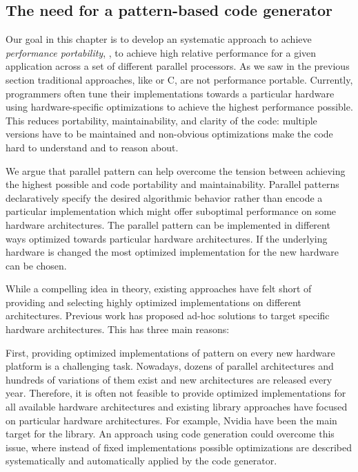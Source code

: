 

\subsection{The need for a pattern-based code generator}

Our goal in this chapter is to develop an systematic approach to achieve \emph{performance portability}, \ie, to achieve high relative performance for a given application across a set of different parallel processors.
As we saw in the previous section traditional approaches, like \OpenCL or C, are not performance portable.
Currently, programmers often tune their implementations towards a particular hardware using hardware-specific optimizations to achieve the highest performance possible.
This reduces portability, maintainability, and clarity of the code:
multiple versions have to be maintained and non-obvious optimizations make the code hard to understand and to reason about.

We argue that parallel pattern can help overcome the tension between achieving the highest possible and code portability and maintainability.
Parallel patterns declaratively specify the desired algorithmic behavior rather than encode a particular implementation which might offer suboptimal performance on some hardware architectures.
The parallel pattern can be implemented in different ways optimized towards particular hardware architectures.
If the underlying hardware is changed the most optimized implementation for the new hardware can be chosen.

While a compelling idea in theory, existing approaches have felt short of providing and selecting highly optimized implementations on different architectures.
Previous work has proposed ad-hoc solutions to target specific hardware architectures.
This has three main reasons:

First, providing optimized implementations of pattern on every new hardware platform is a challenging task.
Nowadays, dozens of parallel architectures and hundreds of variations of them exist and new architectures are released every year.
Therefore, it is often not feasible to provide optimized implementations for all available hardware architectures and existing library approaches have focused on particular hardware architectures.
For example, Nvidia \GPUs have been the main target for the \SkelCL library.
An approach using code generation could overcome this issue, where instead of fixed implementations possible optimizations are described systematically and automatically applied by the code generator.

